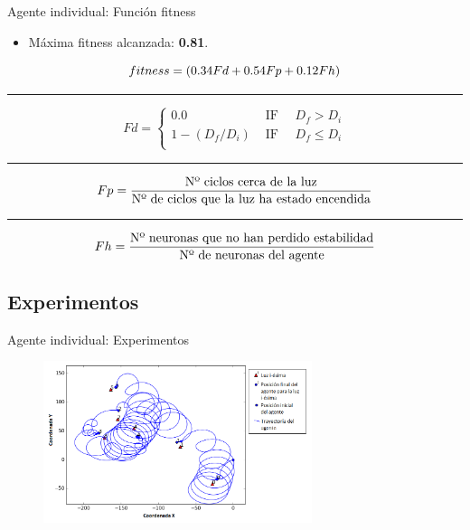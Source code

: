 \documentclass[aspectratio=169]{beamer}
\begin{document}
\begin{frame}{Agente individual: Función fitness}
\begin{itemize}
  \item Máxima fitness alcanzada: \textbf{0.81}.
\end{itemize}

\begin{equation*}
 \centering
  fitness = (0.34Fd + 0.54Fp + 0.12Fh)
\end{equation*}
\noindent\rule{14cm}{0.4pt}
\begin{equation*}
  Fd=\begin{cases}
0.0 & \text{ IF }\quad D_{f} > D_{i}  \\
1 - (D_{f} / D_{i}) & \text{ IF }\quad D_{f} \leq D_{i} \\
\end{cases}
\end{equation*}
\noindent\rule{14cm}{0.4pt}
\begin{equation*}
\centering
Fp = \frac{\text{Nº ciclos cerca de la luz}}{\text{Nº de ciclos que la luz ha estado encendida}}
\end{equation*}
\noindent\rule{14cm}{0.4pt}

\begin{equation*}
\centering
Fh = \frac{\text{Nº neuronas que no han perdido estabilidad}}{\text{Nº de neuronas del agente}}
\end{equation*}
\end{frame}

\subsection{Experimentos}
\begin{frame}{Agente individual: Experimentos}
  \begin{figure}
    \centering
  \includegraphics[width=0.7\textwidth,height=0.7\textheight]{Imagenes/Agente0Trayectoria}
\end{figure}
\end{frame}
\end{document}
